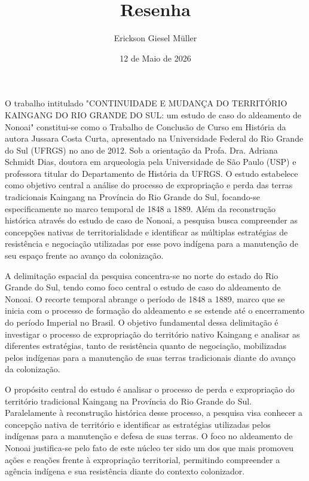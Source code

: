 \documentclass[12pt, a4paper]{article}
\title{Resenha}
\author{Erickson Giesel Müller}
\date{12 de Maio de 2026}
\begin{document}
\maketitle
\thispagestyle{empty} %

O trabalho intitulado "CONTINUIDADE E MUDANÇA DO TERRITÓRIO KAINGANG DO RIO GRANDE DO SUL: um estudo de caso do aldeamento de Nonoai" constitui-se como o Trabalho de Conclusão de Curso em História da autora Jussara Costa Curta, apresentado na Universidade Federal do Rio Grande do Sul (UFRGS) no ano de 2012. Sob a orientação da Profa. Dra. Adriana Schmidt Dias, doutora em arqueologia pela Universidade de São Paulo (USP) e professora titular do Departamento de História da UFRGS. O estudo estabelece como objetivo central a análise do processo de expropriação e perda das terras tradicionais Kaingang na Província do Rio Grande do Sul, focando-se especificamente no marco temporal de 1848 a 1889. Além da reconstrução histórica através do estudo de caso de Nonoai, a pesquisa busca compreender as concepções nativas de territorialidade e identificar as múltiplas estratégias de resistência e negociação utilizadas por esse povo indígena para a manutenção de seu espaço frente ao avanço da colonização.  

A delimitação espacial da pesquisa concentra-se no norte do estado do Rio Grande do Sul, tendo como foco central o estudo de caso do aldeamento de Nonoai. O recorte temporal abrange o período de 1848 a 1889, marco que se inicia com o processo de formação do aldeamento e se estende até o encerramento do período Imperial no Brasil. O objetivo fundamental dessa delimitação é investigar o processo de expropriação do território nativo Kaingang e analisar as diferentes estratégias, tanto de resistência quanto de negociação, mobilizadas pelos indígenas para a manutenção de suas terras tradicionais diante do avanço da colonização.

O propósito central do estudo é analisar o processo de perda e expropriação do território tradicional Kaingang na Província do Rio Grande do Sul. Paralelamente à reconstrução histórica desse processo, a pesquisa visa conhecer a concepção nativa de território e identificar as estratégias utilizadas pelos indígenas para a manutenção e defesa de suas terras. O foco no aldeamento de Nonoai justifica-se pelo fato de este núcleo ter sido um dos que mais promoveu ações e reações frente à expropriação territorial, permitindo compreender a agência indígena e sua resistência diante do contexto colonizador.
\end{document}
